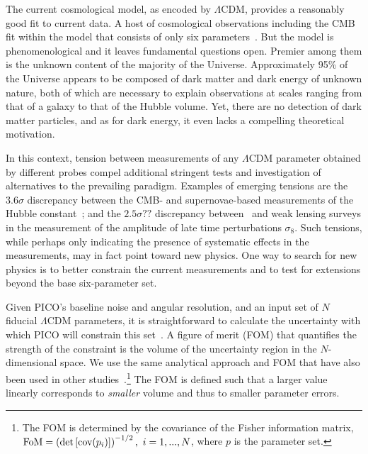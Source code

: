 \documentclass[PICOReport.tex]{subfiles}
\begin{document}

The current cosmological model, as encoded by $\Lambda$CDM, provides a reasonably good fit to current data. A host of cosmological observations including the CMB fit within the model that consists of only six parameters~\citep{Planck2018_I}. But the model is phenomenological and it leaves fundamental questions open. Premier among them is the unknown content of the majority of the Universe. Approximately 95\% of the Universe appears to be composed of dark matter and dark energy of unknown nature, both of which are necessary to explain observations at scales ranging from that of a galaxy to that of the Hubble volume. Yet, there are no detection of dark matter particles, and as for dark energy, it even lacks a compelling theoretical motivation.

In this context, tension between measurements of any $\Lambda$CDM parameter obtained by different probes compel additional stringent tests and investigation of alternatives to the prevailing paradigm. Examples of emerging tensions are the $3.6\sigma$  discrepancy between the CMB- and supernovae-based measurements of the Hubble constant~\citep{??}; and the $2.5\sigma ??$  discrepancy between \planck\ and weak lensing surveys in the  measurement of the amplitude of late time perturbations $\sigma_{8}$. Such tensions, while perhaps only indicating the presence of systematic effects in the measurements, may in fact point toward new physics. One way to search for new physics is to better constrain the current measurements and to test for extensions beyond the base six-parameter set. 

Given PICO's baseline noise and angular resolution, and an input set of $N$ fiducial $\Lambda$CDM parameters, it is straightforward to calculate the uncertainty with which PICO will constrain this set~\citep{divalentino_etal}. A figure of merit (FOM) that quantifies the strength of the constraint is the volume of the uncertainty region in the $N$-dimensional space. We use the same analytical approach and FOM that have also been used in other studies~\cite{divalentino_etal,darkenergy,neutrino}.\footnote{The FOM is determined by the covariance of the Fisher information matrix, ${\rm FoM} = \left( \det \left[ \mbox{cov} ( p_i)  \right] \right)^{-1/2},\,\, i=1, ..., N$, where $p$ is the parameter set.} The FOM is defined such that a larger value linearly corresponds to {\it smaller} volume and thus to smaller parameter errors. 
 
\end{document}
